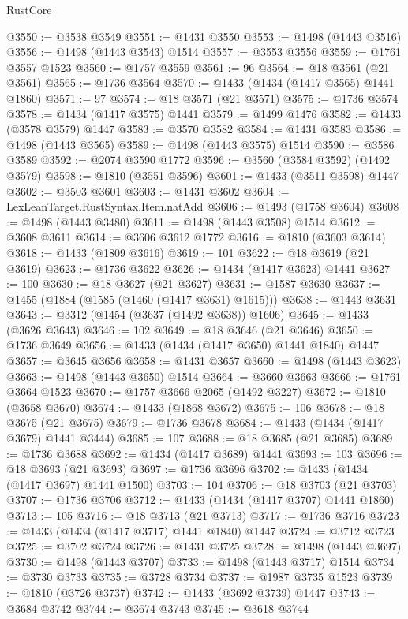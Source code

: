 \begin{lexlean}{RustCore}
\begin{coremodule}
@3550 := @3538 @3549
@3551 := @1431 @3550
@3553 := @1498 (@1443 @3516)
@3556 := @1498 (@1443 @3543) @1514
@3557 := @3553 @3556
@3559 := @1761 @3557 @1523
@3560 := @1757 @3559
@3561 := 96
@3564 := @18 @3561 (@21 @3561)
@3565 := @1736 @3564
@3570 := @1433 (@1434 (@1417 @3565) @1441 @1860)
@3571 := 97
@3574 := @18 @3571 (@21 @3571)
@3575 := @1736 @3574
@3578 := @1434 (@1417 @3575) @1441
@3579 := @1499 @1476
@3582 := @1433 (@3578 @3579) @1447
@3583 := @3570 @3582
@3584 := @1431 @3583
@3586 := @1498 (@1443 @3565)
@3589 := @1498 (@1443 @3575) @1514
@3590 := @3586 @3589
@3592 := @2074 @3590 @1772
@3596 := @3560 (@3584 @3592) (@1492 @3579)
@3598 := @1810 (@3551 @3596)
@3601 := @1433 (@3511 @3598) @1447
@3602 := @3503 @3601
@3603 := @1431 @3602
@3604 := LexLeanTarget.RustSyntax.Item.natAdd
@3606 := @1493 (@1758 @3604)
@3608 := @1498 (@1443 @3480)
@3611 := @1498 (@1443 @3508) @1514
@3612 := @3608 @3611
@3614 := @3606 @3612 @1772
@3616 := @1810 (@3603 @3614)
@3618 := @1433 (@1809 @3616)
@3619 := 101
@3622 := @18 @3619 (@21 @3619)
@3623 := @1736 @3622
@3626 := @1434 (@1417 @3623) @1441
@3627 := 100
@3630 := @18 @3627 (@21 @3627)
@3631 := @1587 @3630
@3637 := @1455 (@1884 (@1585 (@1460 (@1417 @3631) @1615)))
@3638 := @1443 @3631
@3643 := @3312 (@1454 (@3637 (@1492 @3638)) @1606)
@3645 := @1433 (@3626 @3643)
@3646 := 102
@3649 := @18 @3646 (@21 @3646)
@3650 := @1736 @3649
@3656 := @1433 (@1434 (@1417 @3650) @1441 @1840) @1447
@3657 := @3645 @3656
@3658 := @1431 @3657
@3660 := @1498 (@1443 @3623)
@3663 := @1498 (@1443 @3650) @1514
@3664 := @3660 @3663
@3666 := @1761 @3664 @1523
@3670 := @1757 @3666 @2065 (@1492 @3227)
@3672 := @1810 (@3658 @3670)
@3674 := @1433 (@1868 @3672)
@3675 := 106
@3678 := @18 @3675 (@21 @3675)
@3679 := @1736 @3678
@3684 := @1433 (@1434 (@1417 @3679) @1441 @3444)
@3685 := 107
@3688 := @18 @3685 (@21 @3685)
@3689 := @1736 @3688
@3692 := @1434 (@1417 @3689) @1441
@3693 := 103
@3696 := @18 @3693 (@21 @3693)
@3697 := @1736 @3696
@3702 := @1433 (@1434 (@1417 @3697) @1441 @1500)
@3703 := 104
@3706 := @18 @3703 (@21 @3703)
@3707 := @1736 @3706
@3712 := @1433 (@1434 (@1417 @3707) @1441 @1860)
@3713 := 105
@3716 := @18 @3713 (@21 @3713)
@3717 := @1736 @3716
@3723 := @1433 (@1434 (@1417 @3717) @1441 @1840) @1447
@3724 := @3712 @3723
@3725 := @3702 @3724
@3726 := @1431 @3725
@3728 := @1498 (@1443 @3697)
@3730 := @1498 (@1443 @3707)
@3733 := @1498 (@1443 @3717) @1514
@3734 := @3730 @3733
@3735 := @3728 @3734
@3737 := @1987 @3735 @1523
@3739 := @1810 (@3726 @3737)
@3742 := @1433 (@3692 @3739) @1447
@3743 := @3684 @3742
@3744 := @3674 @3743
@3745 := @3618 @3744

\end{coremodule}
\end{lexlean}

